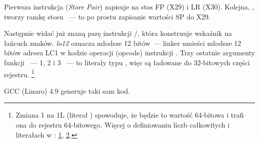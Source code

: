 


Pierwsza instrukcja  (\emph{Store Pair}) zapisuje na stos \ac{FP} (X29) i \ac{LR} (X30).
Kolejna, , tworzy ramkę stosu ~--- to po prostu zapisanie wartości \ac{SP} do X29.

Następnie widać już znaną parę instrukcji /\ADD, która konstruuje wskaźnik na łańcuch znaków.
\emph{lo12} oznacza młodsze 12 bitów~--- linker umieści młodsze 12 bitów adresu LC1 w kodzie operacji (opcode) instrukcji \ADD. Trzy ostatnie argumenty funkcji \printf ~--- 1, 2 i 3 ~--- to literały typu \Tint, więc są ładowane do 32-bitowych części rejestru.
\footnote{Zmiana 1 na 1L (literał ) spowoduje, że będzie to wartość 64-bitowa i trafi ona do rejestru 64-bitowego.
Więcej o definiowaniu liczb całkowitych i literałach w \CCpp:
\href{https://en.cppreference.com/w/c/language/integer_constant}{1},
\href{https://en.cppreference.com/w/cpp/language/integer_literal}{2}.}

\Optimizing GCC (Linaro) 4.9 generuje taki sam kod.

